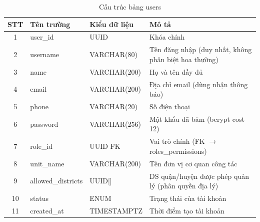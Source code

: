 \renewcommand{\arraystretch}{1.3}
\begin{longtable}{|c|p{3.5cm}|p{4cm}|p{6cm}|}
    \caption{Cấu trúc bảng users}
    \label{tab:db_users} \\

    \hline
    \textbf{STT} & \textbf{Tên trường} & \textbf{Kiểu dữ liệu} & \textbf{Mô tả} \\ \hline
    \endfirsthead

    \hline
    \endhead
    \hline
    \endfoot
    \hline
    \endlastfoot

    1 & user\_id & UUID & Khóa chính \\ \hline
    2 & username & VARCHAR(80) & Tên đăng nhập (duy nhất, không phân biệt hoa thường) \\ \hline
    3 & name & VARCHAR(200) & Họ và tên đầy đủ \\ \hline
    4 & email & VARCHAR(200) & Địa chỉ email (dùng nhận thông báo) \\ \hline
    5 & phone & VARCHAR(20) & Số điện thoại \\ \hline
    6 & password & VARCHAR(256) & Mật khẩu đã băm (bcrypt cost 12) \\ \hline
    7 & role\_id & UUID FK & Vai trò chính (FK $\rightarrow$ roles\_permissions) \\ \hline
    8 & unit\_name & VARCHAR(200) & Tên đơn vị cơ quan công tác \\ \hline
    9 & allowed\_districts & UUID[] & DS quận/huyện được phép quản lý (phân quyền địa lý) \\ \hline
    10 & status & ENUM & Trạng thái của tài khoản \\ \hline
    11 & created\_at & TIMESTAMPTZ & Thời điểm tạo tài khoản \\
\end{longtable}